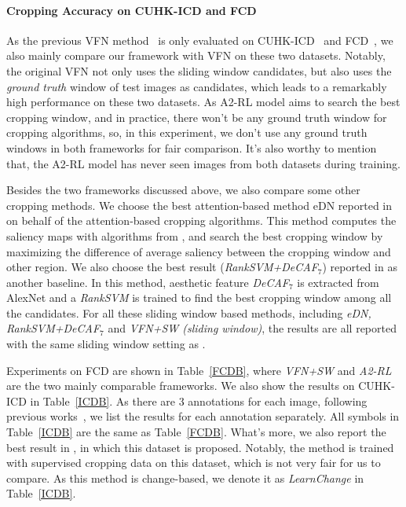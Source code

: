 \documentclass[10pt,twocolumn,letterpaper]{article}
\begin{document}
\paragraph{Cropping Accuracy on CUHK-ICD and FCD}
As the previous VFN method~\cite{chen-acmmm-2017} is only evaluated on CUHK-ICD~\cite{yan2013learning} and FCD~\cite{chen2017quantitative}, we also mainly compare our framework with VFN on these two datasets. Notably, the original VFN not only uses the sliding window candidates, but also uses the \emph{ground truth} window of test images as candidates, which leads to a remarkably high performance on these two datasets. As A2-RL model aims to search the best cropping window, and in practice, there won't be any ground truth window for cropping algorithms, so, in this experiment, we don't use any ground truth windows in both frameworks for fair comparison. It's also worthy to mention that, the A2-RL model has never seen images from both datasets during training.

Besides the two frameworks discussed above, we also compare some other cropping methods. We choose the best attention-based method eDN reported in \cite{chen2017quantitative} on behalf of the attention-based cropping algorithms. This method computes the saliency maps with algorithms from \cite{vig2014large}, and search the best cropping window by maximizing the difference of average saliency between the cropping window and other region. We also choose the best result (\emph{RankSVM+DeCAF$_7$}) reported in \cite{chen2017quantitative} as another baseline. In this method, aesthetic feature \emph{DeCAF$_7$} is extracted from AlexNet and a \emph{RankSVM} is trained to find the best cropping window among all the candidates. For all these sliding window based methods, including \emph{eDN, RankSVM+DeCAF$_7$} and \emph{VFN+SW (sliding window)}, the results are all reported with the same sliding window setting as \cite{chen2017quantitative}.

Experiments on FCD are shown in Table~\ref{FCDB}, where \emph{VFN+SW} and \emph{A2-RL} are the two mainly comparable frameworks. We also show the results on CUHK-ICD in Table~\ref{ICDB}. As there are 3 annotations for each image, following previous works~\cite{yan2013learning,chen2017quantitative,chen-acmmm-2017}, we list the results for each annotation separately. All symbols in Table~\ref{ICDB} are the same as Table~\ref{FCDB}. What's more, we also report the best result in \cite{yan2013learning}, in which this dataset is proposed. Notably, the method is trained with supervised cropping data on this dataset, which is not very fair for us to compare. As this method is change-based, we denote it as \emph{LearnChange} in Table~\ref{ICDB}.
\end{document}
